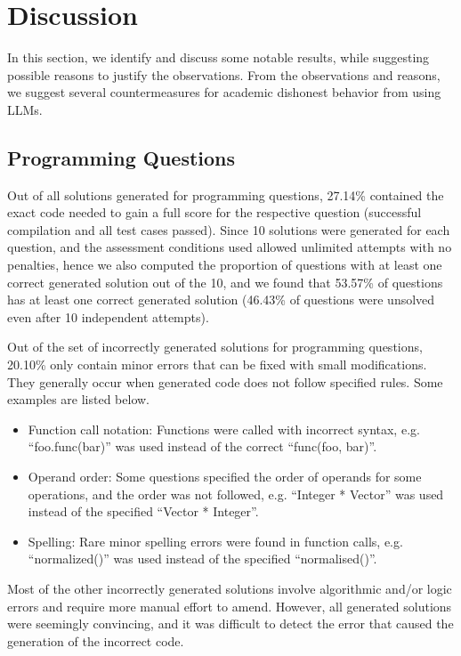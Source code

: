 \documentclass[sigconf,authordraft]{acmart}
\begin{document}
\section{Discussion}
In this section, we identify and discuss some notable results, while suggesting possible reasons to justify the observations. From the observations and reasons, we suggest several countermeasures for academic dishonest behavior from using LLMs.

\subsection{Programming Questions}
Out of all solutions generated for programming questions, 27.14\% contained the exact code needed to gain a full score for the respective question (successful compilation and all test cases passed). Since 10 solutions were generated for each question, and the assessment conditions used allowed unlimited attempts with no penalties, hence we also computed the proportion of questions with at least one correct generated solution out of the 10, and we found that 53.57\% of questions has at least one correct generated solution (46.43\% of questions were unsolved even after 10 independent attempts).

Out of the set of incorrectly generated solutions for programming questions, 20.10\% only contain minor errors that can be fixed with small modifications. They generally occur when generated code does not follow specified rules. Some examples are listed below.
\begin{itemize}
    \item Function call notation: Functions were called with incorrect syntax, e.g. ``foo.func(bar)'' was used instead of the correct ``func(foo, bar)''.
    \item Operand order: Some questions specified the order of operands for some operations, and the order was not followed, e.g. ``Integer * Vector'' was used instead of the specified ``Vector * Integer''.
    \item Spelling: Rare minor spelling errors were found in function calls, e.g. ``normalized()'' was used instead of the specified ``normalised()''.
\end{itemize}

Most of the other incorrectly generated solutions involve algorithmic and/or logic errors and require more manual effort to amend. However, all generated solutions were seemingly convincing, and it was difficult to detect the error that caused the generation of the incorrect code.
\end{document}
